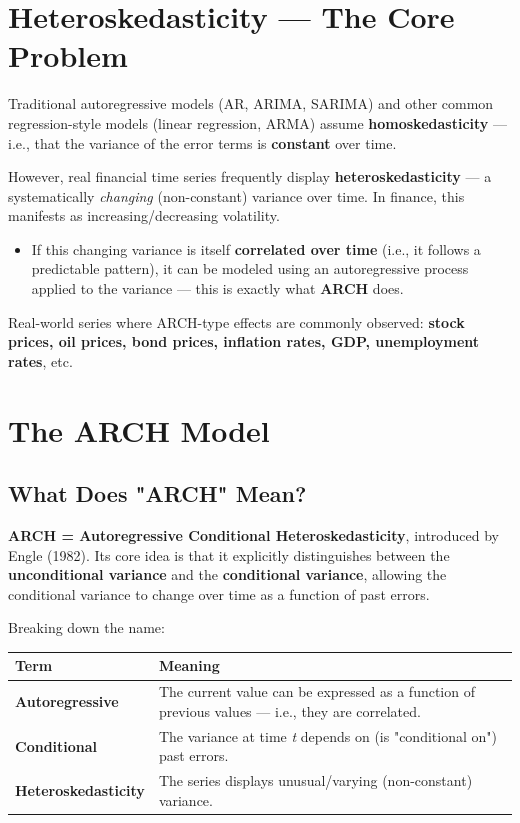 \documentclass[12pt,openany]{book}
\theoremstyle{definition}
\theoremstyle{remark}
\begin{document}
\section{Heteroskedasticity — The Core Problem}

Traditional autoregressive models (AR, ARIMA, SARIMA) and other common regression-style models (linear regression, ARMA) assume \textbf{homoskedasticity} — i.e., that the variance of the error terms is \textbf{constant} over time.

However, real financial time series frequently display \textbf{heteroskedasticity} — a systematically \emph{changing} (non-constant) variance over time. In finance, this manifests as increasing/decreasing volatility.

\begin{itemize}
\item If this changing variance is itself \textbf{correlated over time} (i.e., it follows a predictable pattern), it can be modeled using an autoregressive process applied to the variance — this is exactly what \textbf{ARCH} does.
\end{itemize}

Real-world series where ARCH-type effects are commonly observed: \textbf{stock prices, oil prices, bond prices, inflation rates, GDP, unemployment rates}, etc.


\section{The ARCH Model}

\subsection{What Does "ARCH" Mean?}

\textbf{ARCH = Autoregressive Conditional Heteroskedasticity}, introduced by Engle (1982). Its core idea is that it explicitly distinguishes between the \textbf{unconditional variance} and the \textbf{conditional variance}, allowing the conditional variance to change over time as a function of past errors.

Breaking down the name:

{\small
\begin{longtable}{@{}L{0.28\textwidth}L{0.64\textwidth}@{}}
\toprule
\textbf{Term} & \textbf{Meaning} \\
\midrule
\textbf{Autoregressive} & The current value can be expressed as a function of previous values — i.e., they are correlated. \\
\textbf{Conditional} & The variance at time \emph{t} depends on (is "conditional on") past errors. \\
\textbf{Heteroskedasticity} & The series displays unusual/varying (non-constant) variance. \\
\bottomrule
\end{longtable}
}
\end{document}

